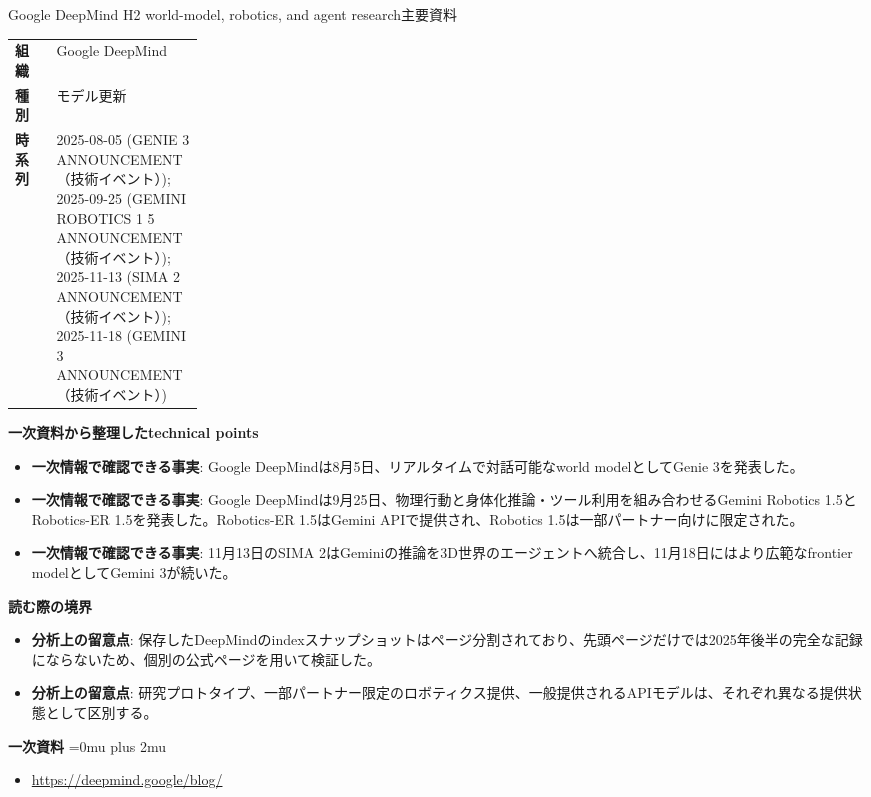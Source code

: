 \begin{technicalnote}{Google DeepMind H2 world-model, robotics, and agent research}{主要資料}
\begingroup
\begin{tabularx}{\linewidth}{@{}>{\bfseries}p{0.22\linewidth}X@{}}
組織 & Google DeepMind \\
種別 & モデル更新 \\
時系列 & 2025-08-05 (GENIE 3 ANNOUNCEMENT（技術イベント）); 2025-09-25 (GEMINI ROBOTICS 1 5 ANNOUNCEMENT（技術イベント）); 2025-11-13 (SIMA 2 ANNOUNCEMENT（技術イベント）); 2025-11-18 (GEMINI 3 ANNOUNCEMENT（技術イベント）) \\
\end{tabularx}
\smallskip
{\bfseries 一次資料から整理したtechnical points}
\begin{itemize}[leftmargin=1.5em,itemsep=0.35em]
\item \textbf{一次情報で確認できる事実}: Google DeepMindは8月5日、リアルタイムで対話可能なworld modelとしてGenie 3を発表した。
\item \textbf{一次情報で確認できる事実}: Google DeepMindは9月25日、物理行動と身体化推論・ツール利用を組み合わせるGemini Robotics 1.5とRobotics-ER 1.5を発表した。Robotics-ER 1.5はGemini APIで提供され、Robotics 1.5は一部パートナー向けに限定された。
\item \textbf{一次情報で確認できる事実}: 11月13日のSIMA 2はGeminiの推論を3D世界のエージェントへ統合し、11月18日にはより広範なfrontier modelとしてGemini 3が続いた。
\end{itemize}
\begin{minipage}{\linewidth}
{\bfseries 読む際の境界}
\begin{itemize}[leftmargin=1.5em,itemsep=0.35em]
\item \textbf{分析上の留意点}: 保存したDeepMindのindexスナップショットはページ分割されており、先頭ページだけでは2025年後半の完全な記録にならないため、個別の公式ページを用いて検証した。
\item \textbf{分析上の留意点}: 研究プロトタイプ、一部パートナー限定のロボティクス提供、一般提供されるAPIモデルは、それぞれ異なる提供状態として区別する。
\end{itemize}
\begin{samepage}
{\bfseries 一次資料}
\begingroup\sloppy
\Urlmuskip=0mu plus 2mu\relax
\begin{itemize}[leftmargin=1.5em,itemsep=0.25em]
\item {\scriptsize\url{https://deepmind.google/blog/}}
\end{itemize}
\endgroup
\end{samepage}
\end{minipage}
\endgroup
\end{technicalnote}
\medskip

